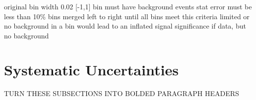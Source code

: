 \begin{comment}
In order to combine the complimentary information from the kinematic variables and the MEs, with the purpose of discriminating a Higgs event from a background event, we used several Boosted Decision Trees (BDTs).
An initial BDT was computed which combined the information from 15 of the computed MEs.\footnote{A BDT was used rather than combining the ME into a likelihood as in the Matrix Element Likelihood Analysis (MELA) used by H$\rightarrow$ZZ$\rightarrow$4l or using some basic ratios of signal over background probabilities as was done by CDF.}
This gives a less discriminating shallow network the ability to create a better performing network because the inputs are already non-linear variables.
The output of this BDT, along with several carefully selected kinematic variables, is then used as the input to a new BDT in order to combine all of this complimentary information.
While it may seem that the MEs should encode all of the event information perfectly, only the leading MEs were used and the permutations of the jets and partons degrades the discrimination power of the MEs.
The combined BDT has more discrimination power than either the MEs or the kinematic variables alone. 

A distribution of the BDT discriminant is produced for every signal, background, and data sample and then passed to the RooStats-based Higgs Combine Tool~\cite{CombineToolTwiki} to compute limits on the Higgs signal strength.
Given that this analysis has a relatively high number of events in the expected yields we make use of the asymptotic method\footnote{If there had been a lower number of expected events we may have needed to use the full frequentist method rather than the asymptotic method.} for limit setting along with the CL\textsubscript{s} test statistic~\cite{Read:2002hq}.
Using an Asimov dataset an expected 95\% upper confidence level is obtained and shown in figure~\ref{fig:limits} (left).
\end{comment}

original bin width 0.02 [-1,1]
bin must have background events
stat error must be less than 10\%
bins merged left to right until all bins meet this criteria
limited or no background in a bin would lead to an inflated signal significance if data, but no background

\section{Systematic Uncertainties}
TURN THESE SUBSECTIONS INTO BOLDED PARAGRAPH HEADERS


